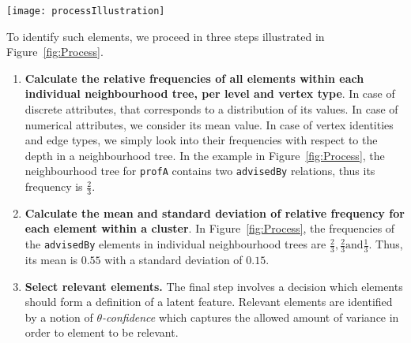 \begin{sidewaysfigure}
	\centering
	\medskip
    \texttt{[image: processIllustration]}
    \caption[Discovering the meaning of latent features by analysing their relations]{\textbf{Discovering the meaning of latent features by analysing their relations.} Properties that describe latent features are the ones that have similar relative frequency in all neighbourhood trees. Starting from a cluster of instances viewed as neighbourhood trees (left), the relative frequencies of elements are calculated for each neighbourhood tree (middle). Next, the mean and standard deviation of relative frequencies are calculated for each individual element within the cluster (right). Which elements \textit{explain} the latent features is decided with $\theta$-confidence. Setting $\theta$ to 0.3 identifies \texttt{advisedBy} and \texttt{teaches} as relevant elements (in black).}
    \label{fig:Process}
\end{sidewaysfigure}





To identify such elements, we proceed in three steps illustrated in Figure~\ref{fig:Process}.
\begin{enumerate}
	\item \textbf{Calculate the relative frequencies of all elements within each individual neighbourhood tree, per level and vertex type}.
    	In case of discrete attributes, that corresponds to a distribution of its values.
		In case of numerical attributes, we consider its mean value.
		In case of vertex identities and edge types, we simply look into their frequencies with respect to the depth in a neighbourhood tree.
        In the example in Figure~\ref{fig:Process}, the neighbourhood tree for \texttt{profA} contains two \texttt{advisedBy} relations, thus its frequency is $\frac{2}{3}$.
    \item \textbf{Calculate the mean and standard deviation of relative frequency for each element within a cluster}.
        In Figure~\ref{fig:Process}, the frequencies of the \texttt{advisedBy} elements in individual neighbourhood trees are $\frac{2}{3}, \frac{2}{3} \text{and} \frac{1}{3}$. Thus, its mean is $0.55$ with a standard deviation of $0.15$.
    \item \textbf{Select relevant elements.}
    	The final step involves a decision which elements should form a definition of a latent feature.
        Relevant elements are identified by a notion of \textit{$\theta$-confidence} which captures the allowed amount of variance in order to element to be relevant.
\end{enumerate}


